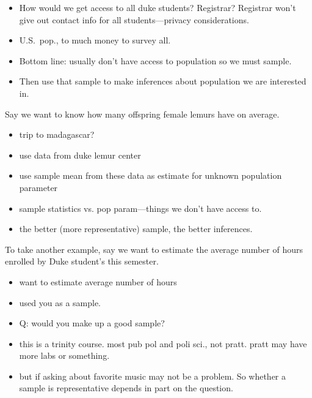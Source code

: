 \documentclass[11pt,containsverbatim,handout,xcolor=xelatex,dvipsnames,table]{beamer}
\begin{document}
\begin{frame}
{\begin{itemize}
\item How would we get access to all duke students?  Registrar?  Registrar won't give out contact info for all students---privacy considerations.

\item U.S.\ pop., to much money to survey all.

\item Bottom line: usually don't have access to population so we must sample.

\item Then use that sample to make inferences about population we are interested in.

\end{itemize}

Say we want to know how many offspring female lemurs have on average.
\begin{itemize}

\item trip to madagascar?

\item use data from duke lemur center

\item use sample mean from these data as estimate for unknown population parameter

\item sample statistics vs. pop param---things we don't have access to.

\item the better (more representative) sample, the better inferences.

\end{itemize}

To take another example, say we want to estimate the average number of hours enrolled by Duke student's this semester.
\begin{itemize}

\item want to estimate average number of hours

\item used you as a sample.

\item Q: would you make up a good sample?

\item  this is a trinity course.  most pub pol and poli sci., not pratt.
pratt may have more labs or something.

\item but if asking about favorite music may not be a problem.  So whether a sample is representative depends in part on the question.


\end{itemize}}
\end{frame}
\end{document}

